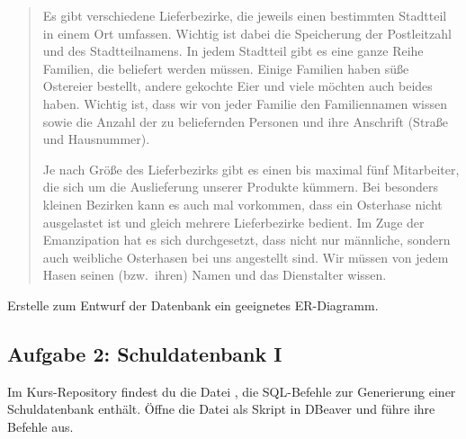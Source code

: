 \begin{quotation}
\noindent
Es gibt verschiedene Lieferbezirke, die jeweils einen bestimmten Stadtteil in
einem Ort umfassen. Wichtig ist dabei die Speicherung der Postleitzahl und des
Stadtteilnamens. In jedem Stadtteil gibt es eine ganze Reihe Familien, die
beliefert werden müssen. Einige Familien haben süße Ostereier bestellt, andere
gekochte Eier und viele möchten auch beides haben. Wichtig ist, dass wir von
jeder Familie den Familiennamen wissen sowie die Anzahl der zu beliefernden
Personen und ihre Anschrift (Straße und Hausnummer).

\noindent
Je nach Größe des Lieferbezirks gibt es einen bis maximal fünf Mitarbeiter, die
sich um die Auslieferung unserer Produkte kümmern. Bei besonders kleinen
Bezirken kann es auch mal vorkommen, dass ein Osterhase nicht ausgelastet ist
und gleich mehrere Lieferbezirke bedient. Im Zuge der Emanzipation hat es sich
durchgesetzt, dass nicht nur männliche, sondern auch weibliche Osterhasen bei
uns angestellt sind. Wir müssen von jedem Hasen seinen (bzw.\ ihren) Namen und
das Dienstalter wissen.
\end{quotation}

Erstelle zum Entwurf der Datenbank ein geeignetes ER-Diagramm.


\subsection{Aufgabe 2: Schuldatenbank I}

Im Kurs-Repository findest du die Datei , die SQL-Befehle zur
Generierung einer Schuldatenbank enthält. Öffne die Datei als Skript in
DBeaver und führe ihre Befehle aus.

